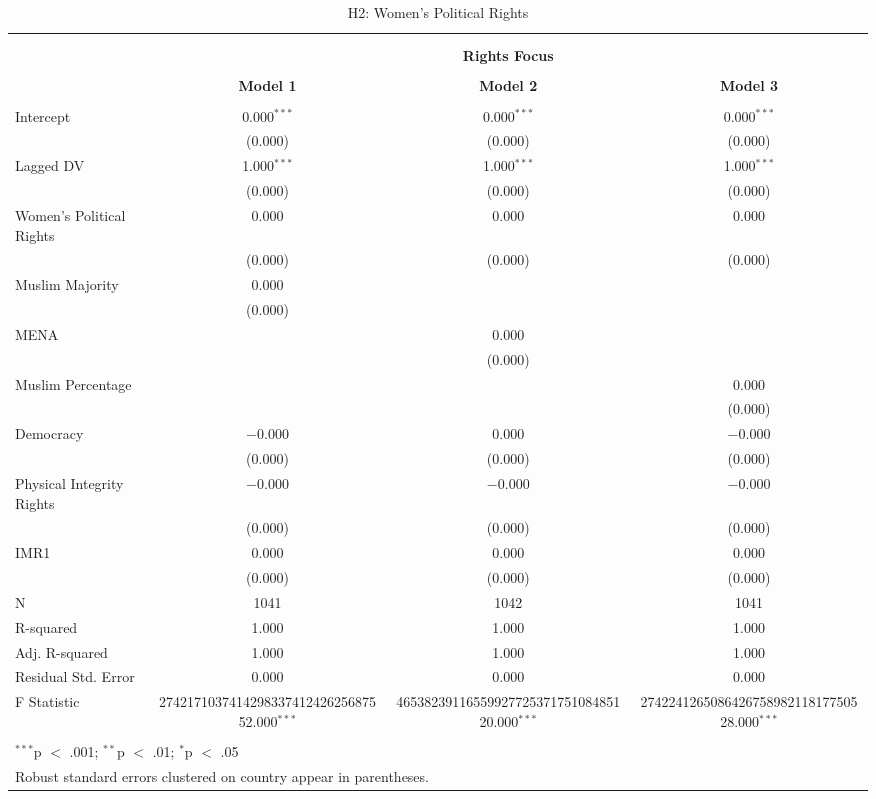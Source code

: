 
\begin{table}[!htbp] \centering 
  \caption{H2: Women's Political Rights} 
  \label{} 
\begin{tabular}{@{\extracolsep{5pt}}lccc} 
\\[-1.8ex]\hline \\[-1.8ex] 
\\[-1.8ex] & \multicolumn{3}{c}{\textbf{Rights Focus}} \\ 
\\[-1.8ex] & \textbf{Model 1} & \textbf{Model 2} & \textbf{Model 3}\\ 
\hline \\[-1.8ex] 
 Intercept & 0.000$^{***}$ & 0.000$^{***}$ & 0.000$^{***}$ \\ 
  & (0.000) & (0.000) & (0.000) \\ 
  Lagged DV & 1.000$^{***}$ & 1.000$^{***}$ & 1.000$^{***}$ \\ 
  & (0.000) & (0.000) & (0.000) \\ 
  Women's Political Rights & 0.000 & 0.000 & 0.000 \\ 
  & (0.000) & (0.000) & (0.000) \\ 
  Muslim Majority & 0.000 &  &  \\ 
  & (0.000) &  &  \\ 
  MENA &  & 0.000 &  \\ 
  &  & (0.000) &  \\ 
  Muslim Percentage &  &  & 0.000 \\ 
  &  &  & (0.000) \\ 
  Democracy & $-$0.000 & 0.000 & $-$0.000 \\ 
  & (0.000) & (0.000) & (0.000) \\ 
  Physical Integrity Rights & $-$0.000 & $-$0.000 & $-$0.000 \\ 
  & (0.000) & (0.000) & (0.000) \\ 
  IMR1 & 0.000 & 0.000 & 0.000 \\ 
  & (0.000) & (0.000) & (0.000) \\ 
 N & 1041 & 1042 & 1041 \\ 
R-squared & 1.000 & 1.000 & 1.000 \\ 
Adj. R-squared & 1.000 & 1.000 & 1.000 \\ 
Residual Std. Error & 0.000 & 0.000 & 0.000 \\ 
F Statistic & 274217103741429833741242625687552.000$^{***}$ & 4653823911655992772537175108485120.000$^{***}$ & 274224126508642675898211817750528.000$^{***}$ \\ 
\hline \\[-1.8ex] 
\multicolumn{4}{l}{$^{***}$p $<$ .001; $^{**}$p $<$ .01; $^{*}$p $<$ .05} \\ 
\multicolumn{4}{l}{Robust standard errors clustered on country appear in parentheses.} \\ 
\end{tabular} 
\end{table} 
